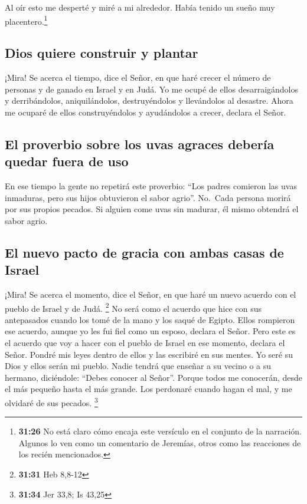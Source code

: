  Al oír esto me desperté y miré a mi alrededor. Había
tenido un sueño muy placentero.\footnote{\textbf{31:26} No está claro
  cómo encaja este versículo en el conjunto de la narración. Algunos lo
  ven como un comentario de Jeremías, otros como las reacciones de los
  recién mencionados.}

\hypertarget{dios-quiere-construir-y-plantar}{%
\subsection{Dios quiere construir y
plantar}\label{dios-quiere-construir-y-plantar}}

 ¡Mira! Se acerca el tiempo, dice el Señor, en que haré
crecer el número de personas y de ganado en Israel y en Judá.
 Yo me ocupé de ellos desarraigándolos y derribándolos,
aniquilándolos, destruyéndolos y llevándolos al desastre. Ahora me
ocuparé de ellos construyéndolos y ayudándolos a crecer, declara el
Señor.

\hypertarget{el-proverbio-sobre-los-uvas-agraces-deberuxeda-quedar-fuera-de-uso}{%
\subsection{El proverbio sobre los uvas agraces debería quedar fuera de
uso}\label{el-proverbio-sobre-los-uvas-agraces-deberuxeda-quedar-fuera-de-uso}}

 En ese tiempo la gente no repetirá este proverbio: ``Los
padres comieron las uvas inmaduras, pero sus hijos obtuvieron el sabor
agrio''.  No.~Cada persona morirá por sus propios
pecados. Si alguien come uvas sin madurar, él mismo obtendrá el sabor
agrio.

\hypertarget{el-nuevo-pacto-de-gracia-con-ambas-casas-de-israel}{%
\subsection{El nuevo pacto de gracia con ambas casas de
Israel}\label{el-nuevo-pacto-de-gracia-con-ambas-casas-de-israel}}

 ¡Mira! Se acerca el momento, dice el Señor, en que haré
un nuevo acuerdo con el pueblo de Israel y de Judá. \footnote{\textbf{31:31}
  Heb 8,8-12}  No será como el acuerdo que hice con sus
antepasados cuando los tomé de la mano y los saqué de Egipto. Ellos
rompieron ese acuerdo, aunque yo les fui fiel como un esposo, declara el
Señor.  Pero este es el acuerdo que voy a hacer con el
pueblo de Israel en ese momento, declara el Señor. Pondré mis leyes
dentro de ellos y las escribiré en sus mentes. Yo seré su Dios y ellos
serán mi pueblo.  Nadie tendrá que enseñar a su vecino o
a su hermano, diciéndole: ``Debes conocer al Señor''. Porque todos me
conocerán, desde el más pequeño hasta el más grande. Los perdonaré
cuando hagan el mal, y me olvidaré de sus pecados. \footnote{\textbf{31:34}
  Jer 33,8; Is 43,25}


